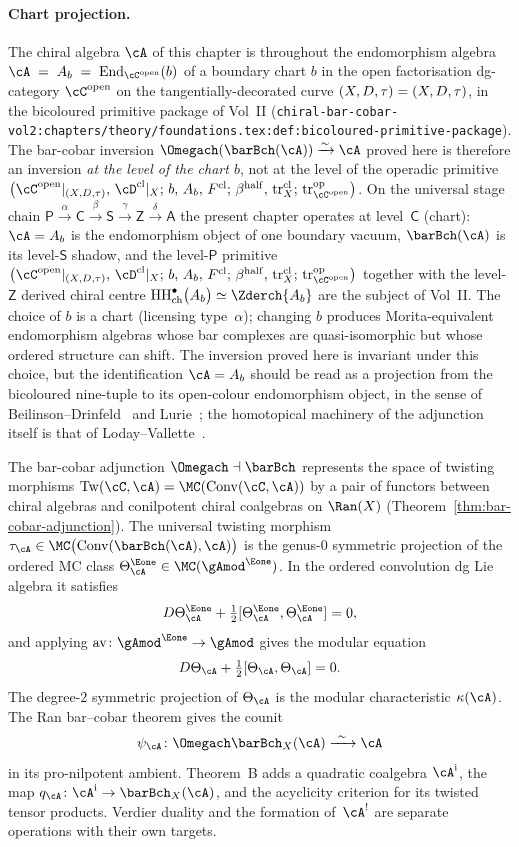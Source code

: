 \paragraph{Chart projection.}
The chiral algebra $\cA$ of this chapter is throughout the endomorphism
algebra
$\cA \;=\; A_b \;=\; \mathrm{End}_{\openFactCat}(b)$
of a boundary chart $b$ in the open factorisation dg-category
$\openFactCat$ on the tangentially-decorated curve
$(X, D, \tau) = (X, D, \tau)$, in the bicoloured primitive package of
Vol~II
\textup{(}\texttt{chiral-bar-cobar-vol2:chapters/theory/foundations.tex:def:bicoloured-primitive-package}\textup{)}.
The
bar-cobar inversion
$\Omegach(\barBch(\cA))\xrightarrow{\sim}\cA$
proved here is therefore an inversion \emph{at the level of the chart
$b$}, not at the level of the operadic primitive
$\primPkgBicolour$. On the universal stage chain
$\mathsf{P}\xrightarrow{\alpha}\mathsf{C}\xrightarrow{\beta}
 \mathsf{S}\xrightarrow{\gamma}\mathsf{Z}\xrightarrow{\delta}\mathsf{A}$
the present chapter operates at level~$\mathsf{C}$ (chart):
$\cA=A_b$ is the endomorphism object of one boundary vacuum,
$\barBch(\cA)$ is its level-$\mathsf{S}$ shadow,
and the level-$\mathsf{P}$ primitive $\primPkgBicolour$ together
with the level-$\mathsf{Z}$ derived chiral centre
$\bulkChirHoch{A_b}\simeq\Zderch{A_b}$ are the subject of Vol~II. The
choice of $b$ is a chart (licensing type~$\alpha$); changing $b$
produces Morita-equivalent endomorphism algebras whose bar complexes
are quasi-isomorphic but whose ordered structure can shift. The
inversion proved here is invariant under this choice, but the
identification $\cA = A_b$ should be read as a projection from the
bicoloured nine-tuple to its open-colour endomorphism object, in the
sense of Beilinson--Drinfeld~\cite{BD04} and
Lurie~\cite[\S5.5]{HA}; the homotopical machinery of the
adjunction itself is that of Loday--Vallette~\cite{LV12}.

The bar-cobar adjunction $\Omegach \dashv \barBch$ represents the
space of twisting morphisms
$\operatorname{Tw}(\cC, \cA) = \MC(\operatorname{Conv}(\cC, \cA))$
by a pair of functors between chiral algebras and conilpotent
chiral coalgebras on $\Ran(X)$
(Theorem~\ref{thm:bar-cobar-adjunction}). The universal twisting
morphism
$\tau_\cA \in \MC\bigl(\operatorname{Conv}(\barBch(\cA), \cA)\bigr)$
is the genus-$0$ symmetric projection of the ordered MC class
$\Theta_\cA^{\Eone}\in\MC({\gAmod}^{\Eone})$. In the ordered
convolution dg Lie algebra it satisfies
\[
D\Theta_\cA^{\Eone}
+\tfrac{1}{2}[\Theta_\cA^{\Eone},\Theta_\cA^{\Eone}]=0,
\]
and applying $\operatorname{av}\colon{\gAmod}^{\Eone}\to\gAmod$
gives the modular equation
\[
D\Theta_\cA+\tfrac{1}{2}[\Theta_\cA,\Theta_\cA]=0.
\]
The degree-$2$ symmetric projection of $\Theta_\cA$ is the modular
characteristic $\kappa(\cA)$.
The Ran bar--cobar theorem gives the counit
\[
 \psi_\cA\colon
 \Omegach\barBch_X(\cA)\xrightarrow{\ \sim\ }\cA
\]
in its pro-nilpotent ambient.  Theorem~B adds a quadratic coalgebra
\(\cA^{\mathrm i}\), the map
\(q_\cA\colon\cA^{\mathrm i}\to\barBch_X(\cA)\), and the acyclicity
criterion for its twisted tensor products.  Verdier duality and the
formation of~\(\cA^!\) are separate operations with their own
targets.

